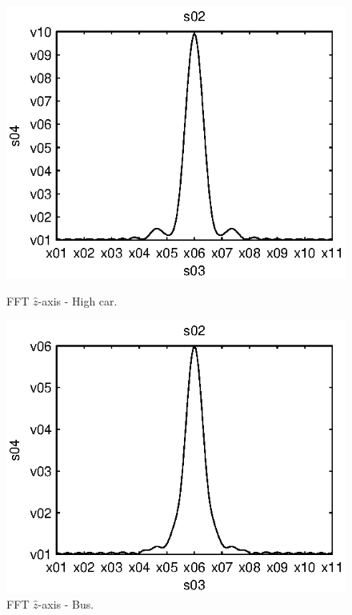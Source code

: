 \begin{subfigures}
\begin{figure}[tfhb]
\begin{minipage}{0.45\linewidth}
 	\centering
 	
	\includegraphics[width=1\linewidth]{images/fft-high_car-z}
  	\caption[FFT $\hat{z}$-axis - High car]{FFT $\hat{z}$-axis - High car.}
  	\label{fig:fft-high_car-z} 
 \end{minipage} \hfill
 \begin{minipage}{0.45\linewidth}
 \centering
 	
	\includegraphics[width=1\linewidth]{images/fft-bus-z}
  	\caption[FFT $\hat{z}$-axis - Bus]{FFT $\hat{z}$-axis - Bus.}
  	\label{fig:fft-bus-z} 
 \end{minipage}
\end{figure}
\end{subfigures}